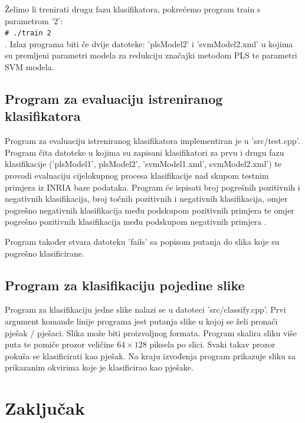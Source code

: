\documentclass[seminar]{fer}
\newcommand{\shellcmd}[1]{\\\indent\indent\texttt{\footnotesize\# #1}\\}
\begin{document}
Želimo li trenirati drugu fazu klasifikatora, pokrećemo program train s parametrom '2': \shellcmd{./train 2}. Izlaz programa biti će dvije datoteke: 'plsModel2' i 'svmModel2.xml' u kojima su premljeni parametri modela za redukciju značajki metodom PLS te parametri SVM modela. 

\section{Program za evaluaciju istreniranog klasifikatora}

Program za evaluaciju istreniranog klasifikatora implementiran je u 'src/test.cpp'. Program čita datoteke u kojima su zapisani klasifikatori za prvu i drugu fazu klasifikacije ('plsModel1', plsModel2', 'svmModel1.xml', svmModel2.xml') te provodi evaluaciju cijelokupnog procesa klasifikacije nad skupom testnim primjera iz INRIA baze podataka. Program će ispisati broj pogrešnih pozitivnih i negativnih klasifikacija, broj točnih pozitivnih i negativnih klasifikacija, omjer pogrešno negativnih klasifikacija među podskupom pozitivnih primjera  te omjer pogrešno pozitivnih klasifikacija među podskupom negativnih primjera . 

Program također stvara datoteku 'fails' sa popisom putanja do slika koje su pogrešno klasificirane. 

\section{Program za klasifikaciju pojedine slike}

Program za klasifikaciju jedne slike nalazi se u datoteci 'src/classify.cpp'. Prvi argument komande linije programa jest putanja slike u kojoj se želi pronaći pješak / pješaci. Slika može biti proizvoljnog formata. Program skalira sliku više puta te  pomiče prozor veličine $64 \times 128$ piksela po slici. Svaki takav prozor pokuša se klasificirati kao pješak. Na kraju izvođenja program prikazuje sliku sa prikazanim okvirima koje je klasificirao kao pješake.

\chapter{Zaključak}



\end{document}
